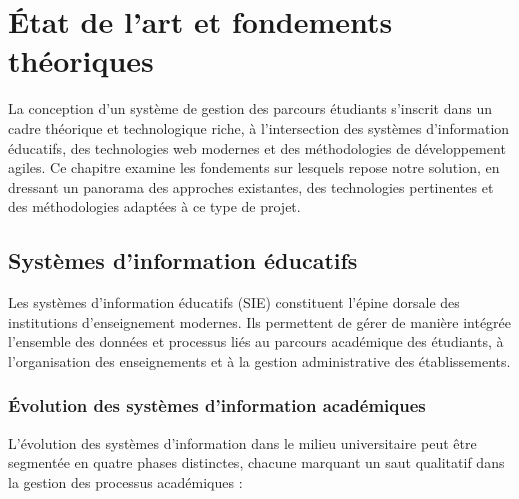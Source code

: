 \documentclass[french,12pt]{report} %
\begin{document}
\chapter{État de l'art et fondements théoriques}

\begin{definitionbox}
La conception d'un système de gestion des parcours étudiants s'inscrit dans un cadre théorique et technologique riche, à l'intersection des systèmes d'information éducatifs, des technologies web modernes et des méthodologies de développement agiles. Ce chapitre examine les fondements sur lesquels repose notre solution, en dressant un panorama des approches existantes, des technologies pertinentes et des méthodologies adaptées à ce type de projet.
\end{definitionbox}

\section{Systèmes d'information éducatifs}

Les systèmes d'information éducatifs (SIE) constituent l'épine dorsale des institutions d'enseignement modernes. Ils permettent de gérer de manière intégrée l'ensemble des données et processus liés au parcours académique des étudiants, à l'organisation des enseignements et à la gestion administrative des établissements.

\subsection{Évolution des systèmes d'information académiques}

L'évolution des systèmes d'information dans le milieu universitaire peut être segmentée en quatre phases distinctes, chacune marquant un saut qualitatif dans la gestion des processus académiques :
\end{document}
